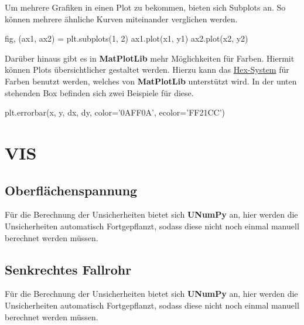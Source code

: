 \documentclass[a4paper,12pt]{article}
\begin{document}
Um mehrere Grafiken in einen Plot zu bekommen, bieten sich Subplots an. So können mehrere ähnliche Kurven miteinander verglichen werden. 
\begin{center}
\begin{tcolorbox}[colback=gray!20, colframe=black, width=1\textwidth, boxrule=1pt, arc=1mm]
fig, (ax1, ax2) = plt.subplots(1, 2) \newline
ax1.plot(x1, y1) \newline
ax2.plot(x2, y2)
\end{tcolorbox}
\end{center}
Darüber hinaus gibt es in \textbf{MatPlotLib} mehr Möglichkeiten für Farben. Hiermit können Plots übersichtlicher gestaltet werden. Hierzu kann das \href{https://www.rapidtables.org/de/web/color/html-color-codes.html}{Hex-System} für Farben benutzt werden, welches von \textbf{MatPlotLib} unterstützt wird. In der unten stehenden Box befinden sich zwei Beispiele für diese.
\begin{center}
\begin{tcolorbox}[colback=gray!20, colframe=black, width=1\textwidth, boxrule=1pt, arc=1mm]
plt.errorbar(x, y, dx, dy, color='0AFF0A', ecolor='FF21CC')
\end{tcolorbox}
\end{center}

\section{VIS}
\subsection{Oberflächenspannung}
Für die Berechnung der Unsicherheiten bietet sich \textbf{UNumPy} an, hier werden die Unsicherheiten automatisch Fortgepflanzt, sodass diese nicht noch einmal manuell berechnet werden müssen.

\subsection{Senkrechtes Fallrohr}
Für die Berechnung der Unsicherheiten bietet sich \textbf{UNumPy} an, hier werden die Unsicherheiten automatisch Fortgepflanzt, sodass diese nicht noch einmal manuell berechnet werden müssen.
\end{document}
